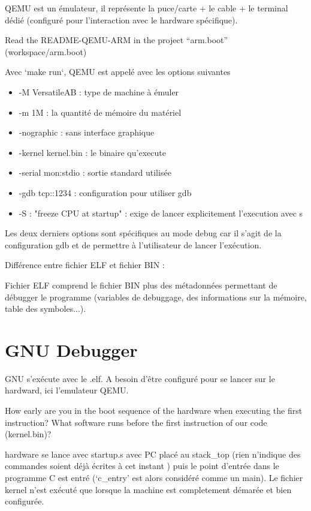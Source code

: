 \documentclass[10]{article}
\begin{document}
QEMU est un émulateur, il représente la puce/carte + le cable + le terminal dédié (configuré pour l'interaction avec le hardware spécifique).

Read the README-QEMU-ARM in the project ``arm.boot'' (workspace/arm.boot)

Avec `make run`, QEMU est appelé avec les options suivantes

\begin{itemize}
  \item -M VersatileAB : type de machine à émuler
  \item -m 1M : la quantité de mémoire du matériel
  \item -nographic : sans interface graphique
  \item -kernel kernel.bin : le binaire qu'execute 
  \item -serial mon:stdio : sortie standard utilisée
  \item -gdb tcp::1234 : configuration pour utiliser gdb
  \item -S : "freeze CPU at startup" : exige de lancer explicitement l'execution avec s
\end{itemize}

Les deux derniers options sont spécifiques au mode debug car il s'agit de la configuration gdb et de permettre à l'utilisateur de lancer l'exécution.

Différence entre fichier ELF et fichier BIN :

Fichier ELF comprend le fichier BIN plus des métadonnées permettant de débugger le programme (variables de debuggage, des informations sur la mémoire, table des symboles...).

\section{GNU Debugger}

GNU s'exécute avec le .elf. A besoin d'être configuré pour se lancer sur le hardward, ici l'emulateur QEMU.

How early are you in the boot sequence of the hardware when
executing the first instruction? What software runs before
the first instruction of our code (kernel.bin)?

hardware se lance avec startup.s avec PC placé au stack_top (rien n'indique des commandes soient déjà écrites à cet instant ) puis le point d'entrée dans le programme C est entré (`c_entry' est alors considéré comme un main). Le fichier kernel n'est exécuté que lorsque la machine est completement démarée et bien configurée.
\end{document}
